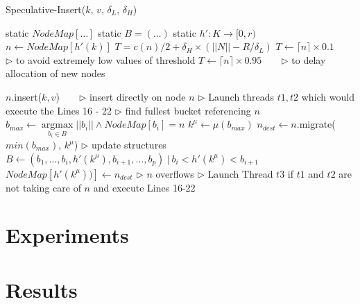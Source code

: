 \begin{algorithm}[htp]
\small
\caption{\label{alg:optimize}Speculative-Insert($k$, $v$, $\delta_L$,
$\delta_H$)} \begin{algorithmic}[1] \STATE static $NodeMap[\ldots]$
\STATE static $B = (\ldots)$
\STATE static $h' : K \rightarrow [0,r)$
\STATE $n \leftarrow NodeMap[h'(k)]$
\STATE $T = c(n)/2 + \delta_H \times (||N|| - R/\delta_L)$
	\STATE $T \leftarrow \lceil{n}\rceil \times 0.1 $\ \ \ \ $\triangleright$ to avoid
	extremely low values of threshold
\ENDIF
{}
	\STATE $T \leftarrow \lceil{n}\rceil \times 0.95$\ \ \ \ $\triangleright$ to delay
	allocation of new nodes
\ENDIF

	\STATE $n$.insert($k,v$)\ \ \ \ $\triangleright$ insert directly on node $n$
	\STATE $\triangleright$ Launch threads $t1,t2$ which would execute the Lines 16 - 22
	\STATE $\triangleright$ find fullest bucket referencing $n$
	\STATE $b_{max} \leftarrow
		\underset{b_i \in B}{\operatorname{argmax}} ||b_i|| \wedge NodeMap[b_i] = n$
	\STATE $k^{\mu} \leftarrow \mu(b_{max})$
	\STATE $n_{dest} \leftarrow n$.migrate($min(b_{max})$, $k^{\mu}$)
	\STATE $\triangleright$ update structures
	\STATE $B \leftarrow (b_1, \ldots, b_i, h'(k^{\mu}), b_{i+1}, \ldots,
	b_p)~|~b_i < h'(k^{\mu}) < b_{i+1}$
	\STATE $NodeMap[h'(k^{\mu}))] \leftarrow n_{dest}$
\ELSE
	\STATE $\triangleright$ $n$ overflows
	\STATE $\triangleright$ Launch Thread $t3$ if $t1$ and $t2$ are not taking care of $n$ and execute Lines 16-22
\ENDIF

\end{algorithmic}
\end{algorithm}



\section{Experiments} %
\label{sec:experiments_indexing}


\section{Results} %
\label{sec:results_indexing}

